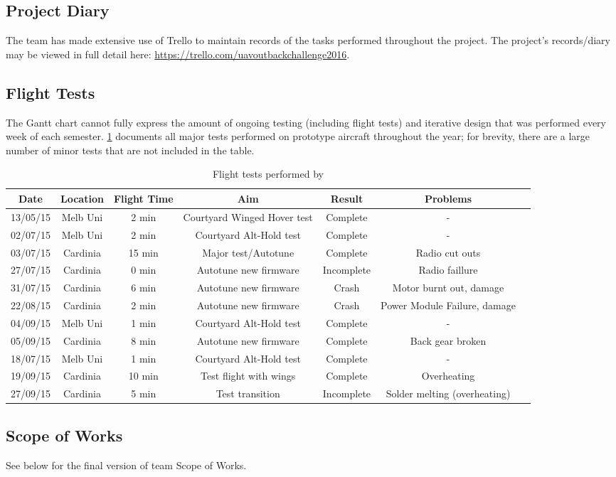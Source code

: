 \subsection{Project Diary}
The team has made extensive use of Trello to maintain records of the tasks performed throughout the project. The project's records/diary may be viewed in full detail here: \url{https://trello.com/uavoutbackchallenge2016}.

\subsection{Flight Tests}
\label{sec:diary}
 The Gantt chart cannot fully express the amount of ongoing testing (including flight tests) and iterative design that was performed every week of each semester. \ref{tab:tests} documents all major tests performed on prototype aircraft throughout the year; for brevity, there are a large number of minor tests that are not included in the table. 
 
\begin{table}[H]
	\centering
	\caption{Flight tests performed by \ID}
	\begin{tabular}{|c|c|c|c|c|c|c|}
		\hline Date & Location & Flight Time & Aim & Result & Problems \\ 
		\hline 13/05/15 & Melb Uni & 2 min & Courtyard Winged Hover test & Complete & - \\ 
		\hline 02/07/15 & Melb Uni & 2 min & Courtyard Alt-Hold test & Complete & - \\ 
		\hline 03/07/15 & Cardinia & 15 min & Major test/Autotune & Complete & Radio cut outs \\ 
		\hline 27/07/15 & Cardinia  & 0 min & Autotune new firmware & Incomplete & Radio faillure \\ 
		\hline 31/07/15 & Cardinia  & 6 min & Autotune new firmware & Crash & Motor burnt out, damage  \\ 
		\hline 22/08/15 & Cardinia  & 2 min & Autotune new firmware & Crash & Power Module Failure, damage\\
		\hline 04/09/15 & Melb Uni & 1 min & Courtyard Alt-Hold test & Complete & - \\  
		\hline 05/09/15 & Cardinia  & 8 min & Autotune new firmware & Complete & Back gear broken\\
		\hline 18/07/15 & Melb Uni & 1 min & Courtyard Alt-Hold test & Complete & - \\  
		\hline 19/09/15 & Cardinia  & 10 min & Test flight with wings & Complete & Overheating \\ 
		\hline 27/09/15 & Cardinia  & 5 min & Test transition & Incomplete & Solder melting (overheating) \\ 
		\hline 
	\end{tabular} 
	\label{tab:tests}
\end{table}

\subsection{Scope of Works}
See below for the final version of team \ID Scope of Works.
